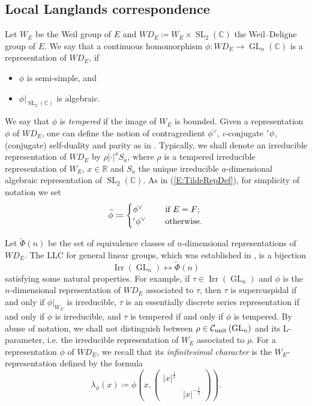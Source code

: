\documentclass[11pt,letterpaper]{amsart}
\theoremstyle{plain}
\numberwithin{theorem}{section}
\numberwithin{equation}{subsection}
\theoremstyle{remark}
\newcommand{\GL}{\operatorname{GL}}
\newcommand{\SL}{\operatorname{SL}}
\newcommand{\Irr}{\operatorname{Irr}}
\newcommand{\C}{\mathbb{C}}
\newcommand{\R}{\mathbb{R}}
\newcommand{\unit}{{\rm unit}}
\def\calC{\mathcal{C}}
\def\ra{\rightarrow}
\begin{document}
\subsection{Local Langlands correspondence}

Let $W_E$ be the Weil group of $E$ and $WD_E \coloneqq W_E\times\SL_2(\C)$ the Weil--Deligne group of $E$. We say that a continuous homomorphism $\phi: WD_E\ra \GL_n(\C)$ is a representation of $WD_E$, if
\begin{itemize}
    \item $\phi$ is semi-simple, and

    \vskip 5pt

    \item $\phi\big|_{\SL_2(\C)}$ is algebraic.
\end{itemize}
\vskip 5pt
We say that $\phi$ is \textit{tempered} if the image of $W_E$ is bounded. Given a representation $\phi$ of $WD_E$, one can define the notion of contragredient $\phi^\vee$, $\iota$-conjugate $\prescript{\iota}{}{\phi}$, (conjugate) self-duality and parity as in \cite[Sect. 3]{MR3202556}. Typically, we shall denote an irreducible representation of $WD_E$ by $\rho|\cdot|^x S_a$, where $\rho$ is a tempered irreducible representation of $W_E$, $x\in\R$ and $S_a$ the unique irreducible $a$-dimensional algebraic representation of $\SL_2(\C)$. As in (\ref{E:TildeRepDef}), for simplicity of notation we set
\[
    \widetilde{\phi} \coloneqq \begin{cases}
     \phi^\vee \quad&\text{ if }E=F;\\
\prescript{\iota}{}\phi^\vee \quad&\text{ otherwise.}   
    \end{cases}
\]

\vskip 5pt

Let $\widetilde{\Phi}\left(n\right)$ be the set of equivalence classes of $n$-dimensional representations of $WD_E$. The LLC for general linear groups, which was established in \cite{MR1876802, MR1738446}, is a bijection
\[
    \Irr\left(\GL_n\right) \longleftrightarrow \widetilde{\Phi}\left(n\right)
\]
satisfying some natural properties. For example, if $\tau\in\Irr\left(\GL_n\right)$ and $\phi$ is the $n$-dimensional representation of $WD_E$ associated to $\tau$, then $\tau$ is supercuspidal if and only if $\phi\big|_{W_E}$ is irreducible, $\tau$ is an essentially discrete series representation if and only if $\phi$ is irreducible, and $\tau$ is tempered if and only if $\phi$ is tempered. By abuse of notation, we shall not distinguish between $\rho\in\calC_{\unit}\left(\GL_n\right)$ and its L-parameter, i.e. the irreducible representation of $W_E$ associated to $\rho$. For a representation $\phi$ of $WD_E$, we recall that its \emph{infinitesimal character} is the $W_E$-representation defined by the formula
\[
    \lambda_\phi(x)\coloneqq \phi\left(x,\left(\begin{array}{cc}
                |x|^{\frac{1}{2}} & \\
                 & |x|^{-\frac{1}{2}}
            \end{array}\right)\right).
\]
\end{document}
